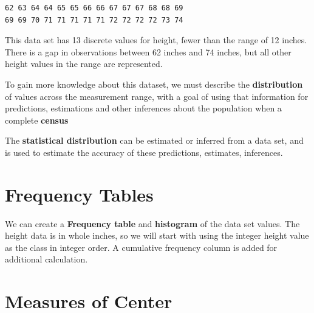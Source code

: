 \documentclass[nohyper,justified]{tufte-handout}\usepackage[]{graphicx}\usepackage[]{color}
\makeatletter
\newenvironment{kframe}{%
 \def\at@end@of@kframe{}%
 \ifinner\ifhmode%
  \def\at@end@of@kframe{\end{minipage}}%
  \begin{minipage}{\columnwidth}%
 \fi\fi%
 \def\FrameCommand##1{\hskip\@totalleftmargin \hskip-\fboxsep
 \colorbox{shadecolor}{##1}\hskip-\fboxsep
     \hskip-\linewidth \hskip-\@totalleftmargin \hskip\columnwidth}%
 \MakeFramed {\advance\hsize-\width
   \@totalleftmargin\z@ \linewidth\hsize
   \@setminipage}}%
 {\par\unskip\endMakeFramed%
 \at@end@of@kframe}
\newenvironment{knitrout}{}{} %
\makeatother
\begin{document}
\begin{knitrout}
\color{fgcolor}\begin{kframe}
\begin{verbatim}
62 63 64 64 65 65 66 66 67 67 67 68 68 69
69 69 70 71 71 71 71 71 72 72 72 72 73 74
\end{verbatim}
\end{kframe}
\end{knitrout}

This data set has 13 discrete values for height, fewer than the range of 12 inches. There is a gap in observations between 62 inches and 74 inches, but all other height values in the range are represented.

To gain more knowledge about this dataset, we must describe the \textbf{distribution} of values across the measurement range, with a goal of using that information for predictions, estimations and other inferences about the population when a complete \textbf{census} 

The \textbf{statistical distribution} can be estimated or inferred from a data set, and 
is used to estimate the accuracy of these predictions, estimates, inferences.

\section{Frequency Tables}
We can create a \textbf{Frequency table} and \textbf{histogram} of the data set values. The height data is in whole inches, so we will start with using the integer height value as the class in integer order. A cumulative frequency column is added for additional calculation.



\section{Measures of Center}
\end{document}
